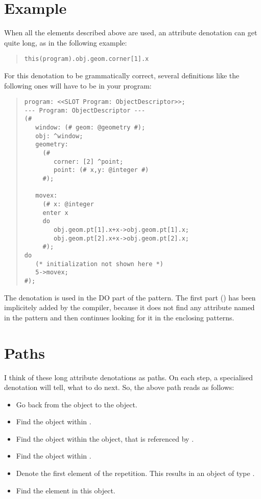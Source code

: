 \section{Example}
When all the elements described above are used, an attribute
denotation can get quite long, as in the following example:
\begin{quote}\begin{verbatim}this(program).obj.geom.corner[1].x
\end{verbatim}\end{quote}
For this denotation to be grammatically correct, several
definitions like the following ones will have to be in your
program:
\begin{quote}\begin{verbatim}program: <<SLOT Program: ObjectDescriptor>>;
--- Program: ObjectDescriptor ---
(#
   window: (# geom: @geometry #);
   obj: ^window;
   geometry:
     (#
        corner: [2] ^point;
        point: (# x,y: @integer #)
     #);

   movex:
     (# x: @integer
     enter x
     do
        obj.geom.pt[1].x+x->obj.geom.pt[1].x;
        obj.geom.pt[2].x+x->obj.geom.pt[2].x;
     #);
do
   (* initialization not shown here *)
   5->movex;
#);
\end{verbatim}\end{quote}
The denotation  is used
in the DO part of the  pattern.  The first part
() has been implicitely added by the
compiler, because it does not find any attribute named 
in the  pattern and then continues looking for it in
the enclosing patterns.

\section{Paths}
I think of these long attribute denotations as paths.  On
each step, a specialised denotation will tell, what to do
next.  So, the above path reads as follows:
\begin{itemize}
\item Go back from the  object to the 
    object.
\item Find the  object within .
\item Find the  object within the object, that
    is referenced by .
\item Find the  object within .
\item Denote the first element of the  repetition.
    This results in an object of type .
\item Find the  element in this  object.
\end{itemize}

